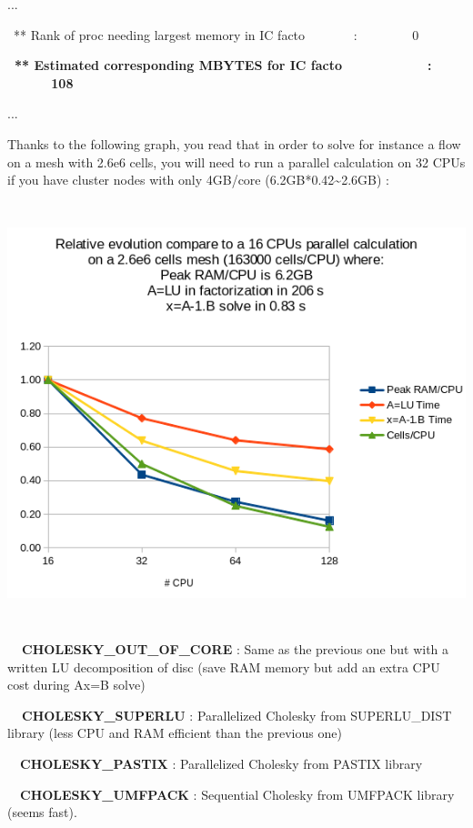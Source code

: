 ...

\ ** Rank of proc needing largest memory in IC facto \ \ \ \ \ \ \ : \ \ \ \ \ \ \ \ 0 

{\bfseries
\ ** Estimated corresponding MBYTES for IC facto \ \ \ \ \ \ \ \ \ \ \ : \ \ \ \ \ \ 108 }

...


\bigskip

Thanks to the following graph, you read that in order to solve for instance a flow on a mesh with 2.6e6 cells, you will
need to run a parallel calculation on 32 CPUs if you have cluster nodes with only 4GB/core (6.2GB*0.42\~{}2.6GB) :



\begin{center}
\includegraphics[width=15.212cm,height=12.266cm]{petsc_graph.png}
\end{center}
\textbf{\ \ CHOLESKY\_OUT\_OF\_CORE }: Same as the previous one but with a written LU decomposition of disc (save RAM
memory but add an extra CPU cost during Ax=B solve)

\textbf{\ \ CHOLESKY\_SUPERLU }: Parallelized Cholesky from SUPERLU\_DIST library (less CPU and RAM
efficient than the previous one) 

\ \ \textbf{CHOLESKY\_PASTIX} : Parallelized Cholesky from PASTIX library

\ \ \textbf{CHOLESKY\_UMFPACK} : Sequential Cholesky from UMFPACK library (seems fast).


